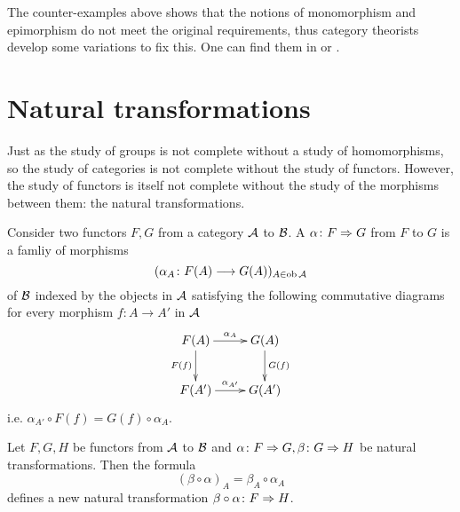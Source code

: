   The counter-examples above shows that the notions of monomorphism and epimorphism do not meet the original requirements, thus category theorists develop some variations to fix this. One can find them in \nlab or \hrefacc.

\newpage\section{Natural transformations}
  Just as the study of groups is not complete without a study of homomorphisms, so the study of categories is not complete without the study of functors.
  However, the study of functors is itself not complete without the study of the morphisms between them: the natural transformations.

  \begin{defn}
    Consider two functors $F,G$ from a category ${\cal A}$ to ${\cal B}$. A  $\alpha\colon F\Rightarrow G$ from $F$ to $G$ is a famliy of morphisms
    \begin{equation*}
    (\alpha_A\colon F(A)\longrightarrow G(A))_{A\in\operatorname{ob}{\cal A}}
    \end{equation*}
    of ${\cal B}$ indexed by the objects in ${\cal A}$ satisfying the following commutative diagrams for every morphism $f\colon A \to A'$ in ${\cal A}$
    \begin{displaymath}
      \xymatrix{
         F(A)\ar[r]^{\alpha_A}\ar[d]_{F(f)}&G(A)\ar[d]^{G(f)}\\
         F(A')\ar[r]^{\alpha_{A'}}&G(A')
      }
    \end{displaymath}
    i.e. $\alpha_{A'}\circ F(f) = G(f) \circ \alpha_{A}$.
  \end{defn}

  Let $F,G,H$ be functors from ${\cal A}$ to ${\cal B}$ and $\alpha\colon F\Rightarrow G, \beta\colon G\Rightarrow H$ be natural transformations. Then the formula
  \begin{equation*}
    (\beta\circ\alpha)_A = \beta_A\circ\alpha_A
  \end{equation*}
  defines a new natural transformation $\beta\circ\alpha\colon F\Rightarrow H$.

